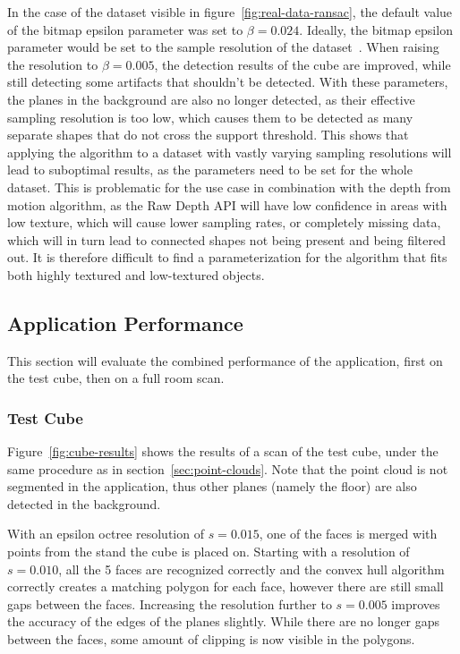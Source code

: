 In the case of the dataset visible in figure~\ref{fig:real-data-ransac},
the default value of the bitmap epsilon parameter was set to $\beta=0.024$.
Ideally, the bitmap epsilon parameter would be set to the sample resolution of the dataset~\parencite{schnabel_efficient_2007}.
When raising the resolution to $\beta=0.005$, the detection results of the cube are improved,
while still detecting some artifacts that shouldn't be detected.
With these parameters, the planes in the background are also no longer detected,
as their effective sampling resolution is too low, which causes them to be detected as many separate shapes that do not cross the support threshold.
This shows that applying the algorithm to a dataset with vastly varying sampling resolutions will
lead to suboptimal results, as the parameters need to be set for the whole dataset.
This is problematic for the use case in combination with the depth from motion algorithm, as the Raw Depth API
will have low confidence in areas with low texture, which will cause lower sampling rates, or completely missing data,
which will in turn lead to connected shapes not being present and being filtered out.
It is therefore difficult to find a parameterization for the algorithm that fits both highly textured and low-textured objects.


\subsection{Application Performance}\label{subsec:application-performance-of-full-room-scan}

This section will evaluate the combined performance of the application, first on the test cube, then on a full room scan.

\subsubsection{Test Cube}
Figure~\ref{fig:cube-results} shows the results of a scan of the test cube, under the same procedure as in section~\ref{sec:point-clouds}.
Note that the point cloud is not segmented in the application, thus other planes (namely the floor) are also detected in the background.

With an epsilon octree resolution of $s=0.015$, one of the faces is merged with points from the stand the cube is placed on.
Starting with a resolution of $s=0.010$, all the 5 faces are recognized correctly and
the convex hull algorithm correctly creates a matching polygon for each face, however there are still small gaps between the faces.
Increasing the resolution further to $s=0.005$ improves the accuracy of the edges of the planes slightly.
While there are no longer gaps between the faces, some amount of clipping is now visible in the polygons.

